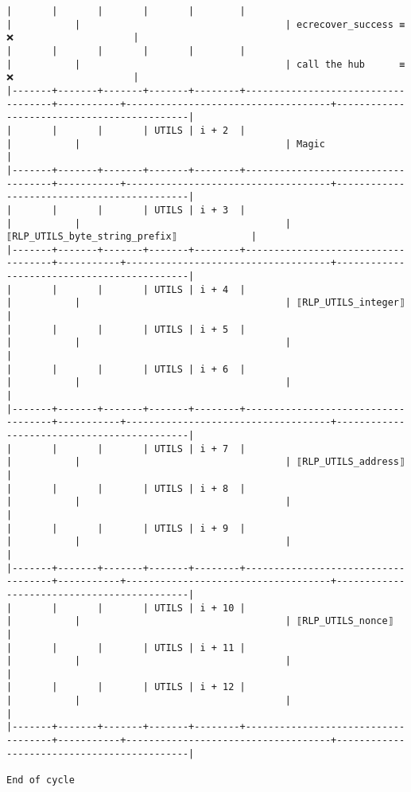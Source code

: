 \documentclass[varwidth=\maxdimen,margin=0.5cm,multi={verbatim}]{standalone}
\begin{document}
\begin{verbatim}
|       |       |       |       |        |                                    |           |                                    | ecrecover_success ≡ ❌                     |
|       |       |       |       |        |                                    |           |                                    | call the hub      ≡ ❌                     |
|-------+-------+-------+-------+--------+------------------------------------+-----------+------------------------------------+--------------------------------------------|
|       |       |       | UTILS | i + 2  |                                    |           |                                    | Magic                                      |
|-------+-------+-------+-------+--------+------------------------------------+-----------+------------------------------------+--------------------------------------------|
|       |       |       | UTILS | i + 3  |                                    |           |                                    | ⟦RLP_UTILS_byte_string_prefix⟧             |
|-------+-------+-------+-------+--------+------------------------------------+-----------+------------------------------------+--------------------------------------------|
|       |       |       | UTILS | i + 4  |                                    |           |                                    | ⟦RLP_UTILS_integer⟧                        |
|       |       |       | UTILS | i + 5  |                                    |           |                                    |                                            |
|       |       |       | UTILS | i + 6  |                                    |           |                                    |                                            |
|-------+-------+-------+-------+--------+------------------------------------+-----------+------------------------------------+--------------------------------------------|
|       |       |       | UTILS | i + 7  |                                    |           |                                    | ⟦RLP_UTILS_address⟧                        |
|       |       |       | UTILS | i + 8  |                                    |           |                                    |                                            |
|       |       |       | UTILS | i + 9  |                                    |           |                                    |                                            |
|-------+-------+-------+-------+--------+------------------------------------+-----------+------------------------------------+--------------------------------------------|
|       |       |       | UTILS | i + 10 |                                    |           |                                    | ⟦RLP_UTILS_nonce⟧                          |
|       |       |       | UTILS | i + 11 |                                    |           |                                    |                                            |
|       |       |       | UTILS | i + 12 |                                    |           |                                    |                                            |
|-------+-------+-------+-------+--------+------------------------------------+-----------+------------------------------------+--------------------------------------------|

End of cycle

\end{verbatim}
\end{document}
